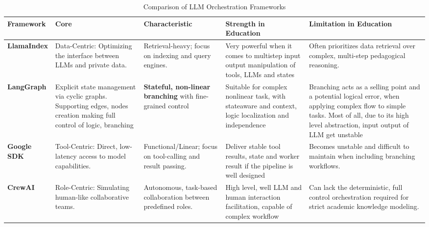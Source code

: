 \begin{table}[H]
\centering
\small
\renewcommand{\arraystretch}{1.6} 
\begin{tabularx}{\textwidth}{@{} l p{2.5cm} p{2.5cm} X X @{}} 
\toprule
\textbf{Framework} & \textbf{Core} & \textbf{Characteristic} & \textbf{Strength in Education} & \textbf{Limitation in Education} \\ \midrule

\textbf{LlamaIndex} & 
Data-Centric: Optimizing the interface between LLMs and private data. & 
Retrieval-heavy; focus on indexing and query engines.& 
Very powerful when it comes to multistep input output manipulation of tools, LLMs and states&
Often prioritizes data retrieval over complex, multi-step pedagogical reasoning. \\ \hline

\textbf{LangGraph} & 
Explicit state management via cyclic graphs. Supporting edges, nodes creation making full control of logic, branching& 
\textbf{Stateful, non-linear branching} with fine-grained control& 
Suitable for complex nonlinear task, with state\-aware and context, logic localization and independence &
Branching acts as a selling point and a potential logical error, when applying complex flow to simple tasks. Most of all, due to its high level abstraction, input output of LLM get unstable\\ \hline

\textbf{Google SDK} & 
Tool-Centric: Direct, low-latency access to model capabilities. & 
Functional/Linear; focus on tool-calling and result passing. & 
Deliver stable tool results, state and worker result if the pipeline is well designed&
Becomes unstable and difficult to maintain when including branching workflows. \\ \hline

\textbf{CrewAI} & 
Role-Centric: Simulating human-like collaborative teams. & 
Autonomous, task-based collaboration between predefined roles. & 
High level, well LLM and human interaction facilitation, capable of complex workflow&
Can lack the deterministic, full control orchestration required for strict academic knowledge modeling. \\ \bottomrule
\end{tabularx}
\caption{Comparison of LLM Orchestration Frameworks}\label{tab:frameworks}
\end{table}